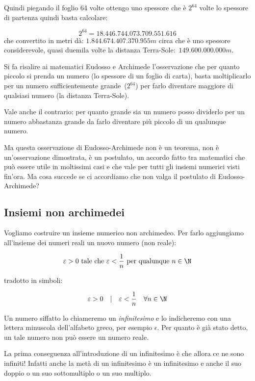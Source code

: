 Quindi piegando il foglio 64 volte ottengo uno spessore che è $2^{64}$ volte 
lo 
spessore di partenza quindi basta calcolare:

\[2^{64} = 18.446.744.073.709.551.616\]
che convertito in metri dà: $1.844.674.407.370.955m$ circa che è uno spessore 
considerevole, quasi duemila volte la distanza Terra-Sole:~$149.600.000.000m$.

Si fa risalire ai matematici Eudosso e Archimede l'osservazione che per 
quanto 
piccolo si prenda un numero (lo spessore di un foglio di carta), basta 
moltiplicarlo per un numero sufficientemente grande~($2^{64}$) per farlo 
diventare maggiore di qualsiasi numero (la distanza Terra-Sole).

Vale anche il contrario: per quanto grande sia un numero posso dividerlo per 
un 
numero abbastanza grande da farlo diventare più piccolo di un qualunque 
numero.

Ma questa osservazione di Eudosso-Archimede non è un teorema, non è 
un'osservazione dimostrata, è un postulato, un accordo fatto tra matematici 
che 
può essere utile in moltissimi casi e che vale per tutti gli insiemi numerici 
visti fin'ora. Ma cosa succede se ci accordiamo che non valga il postulato di 
Eudosso-Archimede?

\subsection{Insiemi non archimedei}
\label{subsec:insnum_nonarchimedei}

Vogliamo costruire un insieme numerico non archimedeo. Per farlo aggiungiamo 
all'insieme dei numeri reali un nuovo numero (non reale):

\[\varepsilon > 0 \text{ tale che } 
\varepsilon < \frac{1}{n} \text{ per qualunque } n \in \N\]

tradotto in simboli:

\[\varepsilon > 0 \quad | \quad \varepsilon < \frac{1}{n} \quad \forall n \in 
\N\]

Un numero siffatto lo chiameremo un \emph{infinitesimo} e lo indicheremo 
con una lettera minuscola dell'alfabeto greco, per esempio $\epsilon$.
Per quanto è già stato detto, un tale numero non può essere un numero
reale. 

La prima conseguenza all'introduzione di un infinitesimo è che allora ce ne 
sono infiniti! Infatti anche la metà di un infinitesimo è un infinitesimo e 
anche il suo doppio o un suo sottomultiplo o un suo multiplo.

